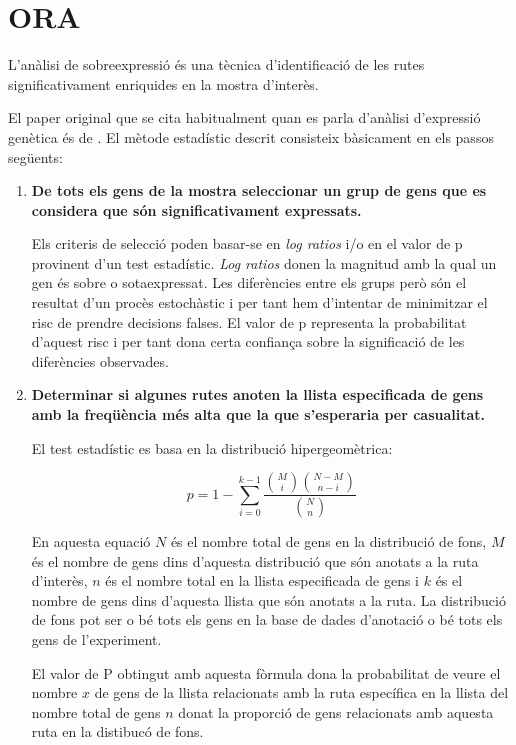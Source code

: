 \section{ORA}

L'anàlisi de sobreexpressió és una tècnica d'identificació de les rutes significativament enriquides en la mostra d'interès. 

El paper original que se cita habitualment quan es parla d'anàlisi d'expressió genètica és de \cite{boyle2004go}. El mètode estadístic descrit consisteix bàsicament en els passos següents:

\begin{enumerate}
\item \textbf{De tots els gens de la mostra seleccionar un grup de gens que es considera que són significativament expressats.}

Els criteris de selecció poden basar-se en \textit{log ratios} i/o en el valor de p provinent d'un test estadístic. \textit{Log ratios} donen la magnitud amb la qual un gen és sobre o sotaexpressat. Les diferències entre els grups però són el resultat d'un procès estochàstic i per tant hem d'intentar de minimitzar el risc de prendre decisions falses. El valor de p representa la probabilitat d'aquest risc i per tant dona certa confiança sobre la significació de les diferències observades.

\item \textbf{Determinar si algunes rutes anoten la llista especificada de gens amb la freqüència més alta que la que s’esperaria per casualitat.} 

El test estadístic es basa en la distribució hipergeomètrica: 

$$p = 1 - \displaystyle\sum_{i = 0}^{k-1}\frac{{M \choose i}{{N-M} \choose {n-i}}} {{N \choose n}}$$

En aquesta equació $N$ és el nombre total de gens en la distribució de fons, $M$ és el nombre de gens dins d'aquesta distribució que són anotats a la ruta d'interès, $n$ és el nombre total en la llista especificada de gens i $k$ és el nombre de gens dins d'aquesta llista que són anotats a la ruta. La distribució de fons pot ser o bé tots els gens en la base de dades d'anotació o bé tots els gens de l'experiment.

El valor de P obtingut amb aquesta fòrmula dona la probabilitat de veure el nombre $x$ de gens de la llista relacionats amb la ruta específica en la llista del nombre total de gens $n$ donat la proporció de gens relacionats amb aquesta ruta en la distibucó de fons.
\end{enumerate}

